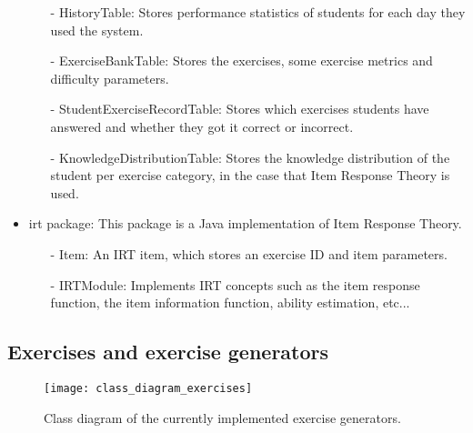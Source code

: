 \begin{itemize}
\begin{itemize}
      \item[-] \textsf{HistoryTable}: Stores performance statistics of students for each day they used the system.
      \item[-] \textsf{ExerciseBankTable}: Stores the exercises, some exercise metrics and difficulty parameters.
      \item[-] \textsf{StudentExerciseRecordTable}: Stores which exercises students have answered and whether they got it correct or incorrect.
      \item[-] \textsf{KnowledgeDistributionTable}: Stores the knowledge distribution of the student per exercise category, in the case that Item Response Theory is used.
      \end{itemize}
\item \textsf{irt} package: This package is a Java implementation of Item Response Theory.
      \begin{itemize}
      \item[-] \textsf{Item}: An IRT item, which stores an exercise ID and item parameters.
      \item[-] \textsf{IRTModule}: Implements IRT concepts such as the item response function, the item information function, ability estimation, etc...
      \end{itemize}
\end{itemize}

\subsection{Exercises and exercise generators}
\begin{figure}[H]
\centering
\texttt{[image: class\_diagram\_exercises]}
\caption{Class diagram of the currently implemented exercise generators.}
\label{fig:class_diagram_exercises}
\end{figure}

